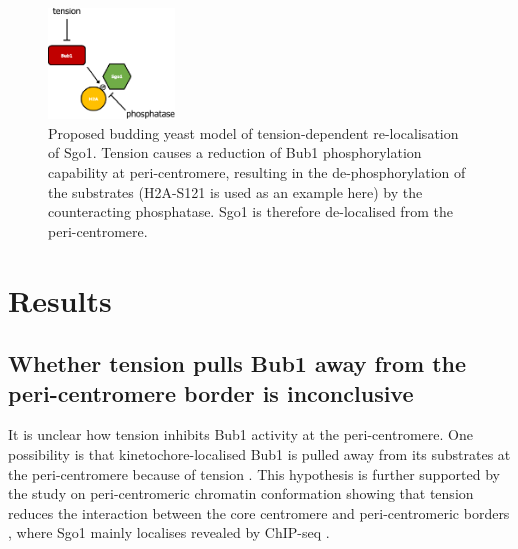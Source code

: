 \begin{figure}[htbp]
  \centering
  \includegraphics[width=0.3\textwidth]{figures/naive model.pdf}
  \caption[Proposed budding yeast model of tension-dependent re-localisation of Sgo1]{Proposed budding yeast model of tension-dependent re-localisation of Sgo1. Tension causes a reduction of Bub1 phosphorylation capability at peri-centromere, resulting in the de-phosphorylation of the substrates (H2A-S121 is used as an example here) by the counteracting phosphatase. Sgo1 is therefore de-localised from the peri-centromere.}
  \label{fig:naive}
\end{figure} 



\section{Results}
\subsection{Whether tension pulls Bub1 away from the peri-centromere border is inconclusive}
It is unclear how tension inhibits Bub1 activity at the peri-centromere. One possibility is that kinetochore-localised Bub1 is pulled away from its substrates at the peri-centromere because of tension \citep{Nerusheva2014}. This hypothesis is further supported by the study on peri-centromeric chromatin conformation showing that tension reduces the interaction between the core centromere and peri-centromeric borders \citep{Paldi2020ConvergentPericentromeres}, where Sgo1 mainly localises revealed by ChIP-seq \citep{Verzijlbergen2014, Deng2018}. 


